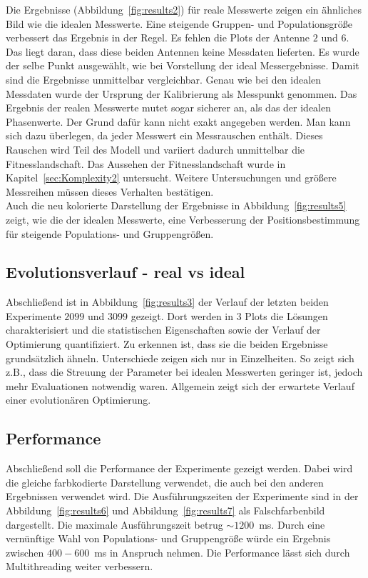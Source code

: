 Die Ergebnisse (Abbildung~\ref{fig:results2}) für reale Messwerte zeigen ein ähnliches Bild wie die idealen Messwerte. Eine steigende Gruppen- und Populationsgröße verbessert das Ergebnis in der Regel. Es fehlen die Plots der Antenne $2$ und $6$. Das liegt daran, dass diese beiden Antennen keine Messdaten lieferten. Es wurde der selbe Punkt ausgewählt, wie bei Vorstellung der ideal Messergebnisse. Damit sind die Ergebnisse unmittelbar vergleichbar. Genau wie bei den idealen Messdaten wurde der Ursprung der Kalibrierung als Messpunkt genommen. Das Ergebnis der realen Messwerte mutet sogar sicherer an, als das der idealen Phasenwerte. Der Grund dafür kann nicht exakt angegeben werden. Man kann sich dazu überlegen, da jeder Messwert ein Messrauschen enthält. Dieses Rauschen wird Teil des Modell und variiert dadurch unmittelbar die Fitnesslandschaft. Das Aussehen der Fitnesslandschaft wurde in Kapitel~\ref{sec:Komplexity2} untersucht. Weitere Untersuchungen und größere Messreihen müssen dieses Verhalten bestätigen.\\

Auch die neu kolorierte Darstellung der Ergebnisse in Abbildung~\ref{fig:results5} zeigt, wie die der idealen Messwerte, eine Verbesserung der Positionsbestimmung für steigende Populations- und Gruppengrößen.
%
%
\subsection{Evolutionsverlauf - real vs ideal}
%
Abschließend ist in Abbildung~\ref{fig:results3} der Verlauf der letzten beiden Experimente $2099$ und $3099$ gezeigt. Dort werden in $3$ Plots die Lösungen charakterisiert und die statistischen Eigenschaften sowie der Verlauf der Optimierung quantifiziert. Zu erkennen ist, dass sie die beiden Ergebnisse grundsätzlich ähneln. Unterschiede zeigen sich nur in Einzelheiten. So zeigt sich z.B., dass die Streuung der Parameter bei idealen Messwerten geringer ist, jedoch mehr Evaluationen notwendig waren. Allgemein zeigt sich der erwartete Verlauf einer evolutionären Optimierung.
%
%
\subsection{Performance}
%
Abschließend soll die Performance der Experimente gezeigt werden. Dabei wird die gleiche farbkodierte Darstellung verwendet, die auch bei den anderen Ergebnissen verwendet wird. Die Ausführungszeiten der Experimente sind in der Abbildung~\ref{fig:results6} und Abbildung~\ref{fig:results7} als Falschfarbenbild dargestellt. Die maximale Ausführungszeit betrug $\sim1200$~ms. Durch eine vernünftige Wahl von Populations- und Gruppengröße würde ein Ergebnis zwischen $400-600$~ms in Anspruch nehmen. Die Performance lässt sich durch Multithreading weiter verbessern.
%

